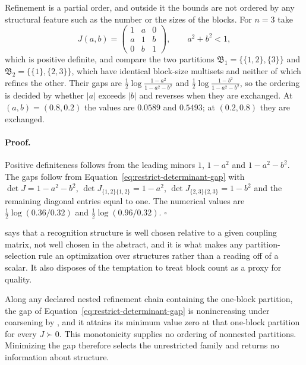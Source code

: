 Refinement is a partial order, and outside it the bounds are not ordered by any structural feature such as the number or the sizes of the blocks. For $n=3$ take
\begin{equation}
J(a,b)=\begin{pmatrix}1&a&0\\a&1&b\\0&b&1\end{pmatrix},
\qquad
a^2+b^2<1,
\label{eq:restrict-nonnested-witness}
\end{equation}
which is positive definite, and compare the two partitions $\mathfrak B_1=\{\{1,2\},\{3\}\}$ and $\mathfrak B_2=\{\{1\},\{2,3\}\}$, which have identical block-size multisets and neither of which refines the other. Their gaps are $\tfrac12\log\frac{1-a^2}{1-a^2-b^2}$ and $\tfrac12\log\frac{1-b^2}{1-a^2-b^2}$, so the ordering is decided by whether $\lvert a\rvert$ exceeds $\lvert b\rvert$ and reverses when they are exchanged. At $(a,b)=(0.8,0.2)$ the values are $0.0589$ and $0.5493$; at $(0.2,0.8)$ they are exchanged. 

\paragraph{Proof.}
Positive definiteness follows from the leading minors $1$, $1-a^2$ and $1-a^2-b^2$. The gaps follow from Equation~\eqref{eq:restrict-determinant-gap} with $\det J=1-a^2-b^2$, $\det J_{\{1,2\}\{1,2\}}=1-a^2$, $\det J_{\{2,3\}\{2,3\}}=1-b^2$ and the remaining diagonal entries equal to one. The numerical values are $\tfrac12\log(0.36/0.32)$ and $\tfrac12\log(0.96/0.32)$. $\square$

 says that a recognition structure is well chosen relative to a given coupling matrix, not well chosen in the abstract, and it is what makes any partition-selection rule an optimization over structures rather than a reading off of a scalar. It also disposes of the temptation to treat block count as a proxy for quality.

Along any declared nested refinement chain containing the one-block partition,
the gap of Equation~\eqref{eq:restrict-determinant-gap} is nonincreasing
under coarsening by , and it
attains its minimum value zero at that one-block partition for every
$J\succ0$. This monotonicity supplies no ordering of nonnested partitions.
Minimizing the gap therefore selects the unrestricted family and returns no
information about structure. 

